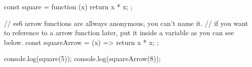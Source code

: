\documentclass{article}
\begin{document}
const square = function (x) {
    return x * x;
};

// es6 arrow functions are allways anonymous, you can't name it.
// if you want to reference to a arrow function later, put it inside a variable as you can see below.
const squareArrow = (x) => {
    return x * x;
};

console.log(square(5));
console.log(squareArrow(8));
\end{document}
